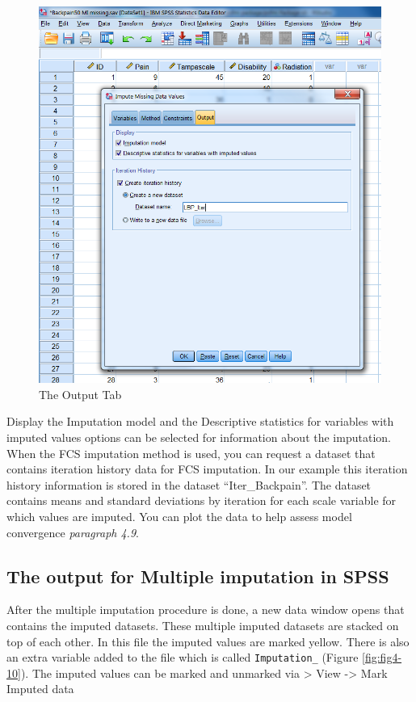 \documentclass[]{book}
\theoremstyle{definition}
\theoremstyle{definition}
\theoremstyle{definition}
\theoremstyle{remark}
\begin{document}
\begin{figure}

{\centering \includegraphics[width=0.9\linewidth]{images/fig4.9} 

}

\caption{The Output Tab}\label{fig:fig4-9}
\end{figure}

Display the Imputation model and the Descriptive statistics for
variables with imputed values options can be selected for information
about the imputation. When the FCS imputation method is used, you can
request a dataset that contains iteration history data for FCS
imputation. In our example this iteration history information is stored
in the dataset ``Iter\_Backpain''. The dataset contains means and
standard deviations by iteration for each scale variable for which
values are imputed. You can plot the data to help assess model
convergence \emph{paragraph 4.9}.

\subsection{The output for Multiple imputation in
SPSS}\label{the-output-for-multiple-imputation-in-spss}

After the multiple imputation procedure is done, a new data window opens
that contains the imputed datasets. These multiple imputed datasets are
stacked on top of each other. In this file the imputed values are marked
yellow. There is also an extra variable added to the file which is
called \texttt{Imputation\_} (Figure \ref{fig:fig4-10}). The imputed
values can be marked and unmarked via \textgreater{} View
-\textgreater{} Mark Imputed data
\end{document}
